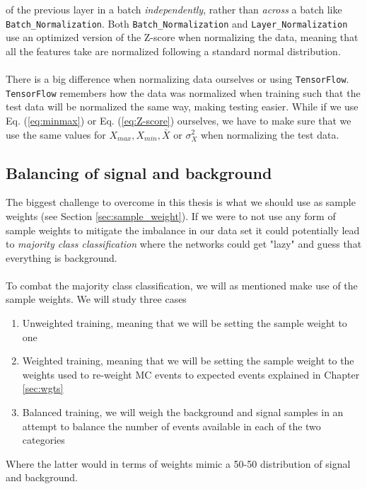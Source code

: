 \documentclass[12pt, a4paper]{book}
\begin{document}
of the previous layer in a batch \textit{independently}, rather than \textit{across} a batch like \verb|Batch_Normalization|. Both \verb|Batch_Normalization| and \verb|Layer_Normalization| use an optimized version of the Z-score when normalizing the data, meaning that all the features 
take are normalized following a standard normal distribution.\\
\\There is a big difference when normalizing data ourselves or using \verb|TensorFlow|. \verb|TensorFlow| remembers how the data was normalized when training such that the test data will be normalized the same way, making testing easier. While if we use Eq. (\ref{eq:minmax}) or 
Eq. (\ref{eq:Z-score}) ourselves, we have to make sure that we use the same values for $X_{max}, X_{min}, \bar{X}$ or $\sigma_X^2$ when normalizing the test data. 



\subsection{Balancing of signal and background}\label{sec:balance_NN}
The biggest challenge to overcome in this thesis is what we should use as sample weights (see Section \ref{sec:sample_weight}). If we were to not use any form of sample weights to mitigate the imbalance in our data set it could potentially lead to \textit{majority class classification} where the 
networks could get "lazy" and guess that everything is background. \\
\\To combat the majority class classification, we will as mentioned make use of the sample weights. We will study three cases
\begin{enumerate}
   \item Unweighted training, meaning that we will be setting the sample weight to one
   \item Weighted training, meaning that we will be setting the sample weight to the weights used to re-weight MC events to expected events explained in Chapter \ref{sec:wgts}
   \item Balanced training, we will weigh the background and signal samples in an attempt to balance the number of events available in each of the two categories
\end{enumerate}
Where the latter would in terms of weights mimic a 50-50 distribution of signal and background. 
\end{document}
